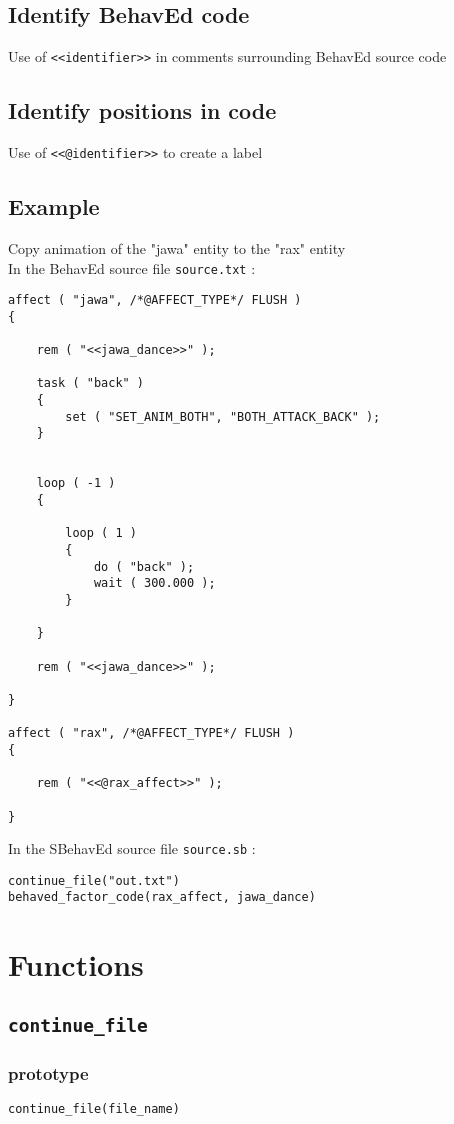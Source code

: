 \documentclass{article}
\begin{document}
\subsection{Identify BehavEd code}
Use of \texttt{<<identifier>>} in comments surrounding BehavEd source code
\subsection{Identify positions in code}
Use of \texttt{<<@identifier>>} to create a label
\subsection{Example}
Copy animation of the "jawa" entity to the "rax" entity\\
In the BehavEd source file \texttt{source.txt} :
\begin{lstlisting}
affect ( "jawa", /*@AFFECT_TYPE*/ FLUSH )
{

	rem ( "<<jawa_dance>>" );

	task ( "back" )
	{
		set ( "SET_ANIM_BOTH", "BOTH_ATTACK_BACK" );
	}


	loop ( -1 )
	{

		loop ( 1 )
		{
			do ( "back" );
			wait ( 300.000 );
		}

	}

	rem ( "<<jawa_dance>>" );

}

affect ( "rax", /*@AFFECT_TYPE*/ FLUSH )
{

	rem ( "<<@rax_affect>>" );

}
\end{lstlisting}
In the SBehavEd source file \texttt{source.sb} :
\begin{lstlisting}
continue_file("out.txt")
behaved_factor_code(rax_affect, jawa_dance)
\end{lstlisting}


\newpage
\section{Functions}

\subsection{\texttt{continue_file}}
\subsubsection*{prototype}
\begin{lstlisting}
continue_file(file_name)
\end{lstlisting}
\end{document}
